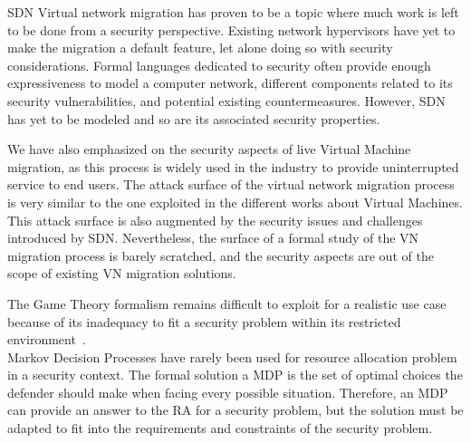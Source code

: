 SDN Virtual network migration has proven to be a topic where much work is left to be done from a security perspective.
Existing network hypervisors have yet to make the migration a default feature, let alone doing so with security considerations.
Formal languages dedicated to security often provide enough expressiveness to model a computer network, different components related to its security vulnerabilities, and potential existing countermeasures.
However, SDN has yet to be modeled and so are its associated security properties.

We have also emphasized on the security aspects of live Virtual Machine migration, as this process is widely used in the industry to provide uninterrupted service to end users. 
The attack surface of the virtual network migration process is very similar to the one exploited in the different works about Virtual Machines. This attack surface is also augmented by the security issues and challenges introduced by SDN. Nevertheless, the surface of a formal study of the VN migration process is barely scratched, and the security aspects are out of the scope of existing VN migration solutions.

The Game Theory formalism remains difficult to exploit for a realistic use case because of its inadequacy to fit a security problem within its restricted environment~\cite{Kiennert2018}. \\
Markov Decision Processes have rarely been used for resource allocation problem in a security context. The formal solution a MDP is the set of optimal choices the defender should make when facing every possible situation. Therefore, an MDP can provide an answer to the RA for a security problem, but the solution must be adapted to fit into the requirements and constraints of the security problem.
